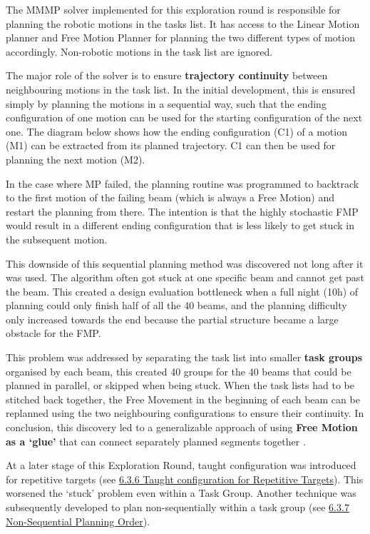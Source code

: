 The MMMP solver implemented for this exploration round is responsible for planning the robotic motions in the tasks list. It has access to the Linear Motion planner and Free Motion Planner for planning the two different types of motion accordingly. Non-robotic motions in the task list are ignored.




The major role of the solver is to ensure \textbf{trajectory continuity} between neighbouring motions in the task list. In the initial development, this is ensured simply by planning the motions in a sequential way, such that the ending configuration of one motion can be used for the starting configuration of the next one. The diagram below shows how the ending configuration (C1) of a motion (M1) can be extracted from its planned trajectory. C1 can then be used for planning the next motion (M2).




In the case where MP failed, the planning routine was programmed to backtrack to the first motion of the failing beam (which is always a Free Motion) and restart the planning from there. The intention is that the highly stochastic FMP would result in a different ending configuration that is less likely to get stuck in the subsequent motion.

This downside of this sequential planning method was discovered not long after it was used. The algorithm often got stuck at one specific beam and cannot get past the beam. This created a design evaluation bottleneck when a full night (10h) of planning could only finish half of all the 40 beams, and the planning difficulty only increased towards the end because the partial structure became a large obstacle for the FMP.

This problem was addressed by separating the task list into smaller \textbf{task groups }organised by each beam, this created 40 groups for the 40 beams that could be planned in parallel, or skipped when being stuck. When the task lists had to be stitched back together, the Free Movement in the beginning of each beam can be replanned using the two neighbouring configurations to ensure their continuity. In conclusion, this discovery led to a generalizable approach of using \textbf{Free Motion as a ‘glue’} that can connect separately planned segments together \parencite{lozanoperezConstraintBasedMethodSolving2014}.

At a later stage of this Exploration Round, taught configuration was introduced for repetitive targets (see \ul{6.3.6 Taught configuration for Repetitive Targets}). This worsened the ‘stuck’ problem even within a Task Group. Another technique was subsequently developed to plan non-sequentially within a task group (see \ul{6.3.7 Non-Sequential Planning Order}).

